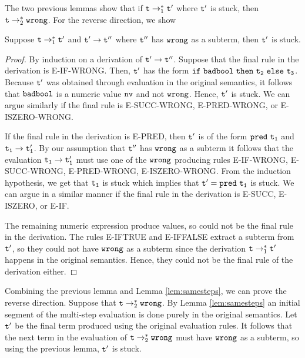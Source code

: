 The two previous lemmas show that if $\term{t} \marr_1 \term{t'}$ where $\term{t'}$ is stuck,
then $\term{t} \marr_2 \wrong$.  For the reverse direction, we show

\begin{lem} Suppose $\term{t} \marr_1 \term{t'}$ and $\term{t'} \sarr_2 \term{t''}$ where $\term{t''}$
    has $\wrong$ as a subterm, then $\term{t'}$ is stuck.
\end{lem}
\begin{proof} By induction on a derivation of $\term{t'} \sarr_2 \term{t''}$.
    Suppose that the final rule in the derivation is E-IF-WRONG. Then, $\term{t'}$ has the form
    $\ifthenelse{\badbool}{\term{t_2}}{\term{t_3}}$.  Because $\term{t'}$ was obtained through evaluation
    in the original semantics, it follows that $\badbool$ is a numeric value $\term{nv}$ and not $\wrong$.
    Hence, $\term{t'}$ is stuck.
    We can argue similarly if the final rule is E-SUCC-WRONG, E-PRED-WRONG, or E-ISZERO-WRONG.  

    If the final rule in the derivation is E-PRED, then $\term{t'}$ is of the form
    $\pred{\term{t_1}}$ and $\term{t_1} \sarr_2 \term{t_1'}$.  By our assumption that $\term{t''}$
    has $\wrong$ as a subterm it follows that the evaluation $\term{t_1} \sarr_2 \term{t_1'}$ must use
    one of the $\wrong$ producing rules E-IF-WRONG, E-SUCC-WRONG, E-PRED-WRONG, E-ISZERO-WRONG.  From the 
    induction hypothesis, we get that $\term{t_1}$ is stuck which implies that 
    $\term{t'} = \pred{\term{t_1}}$ is stuck.  We can argue in a similar manner if the final rule in
    the derivation is E-SUCC, E-ISZERO, or E-IF.

    The remaining numeric expression produce values, so could not be the final rule in the derivation.
    The rules E-IFTRUE and E-IFFALSE extract a subterm from $\term{t'}$, so they could not have $\wrong$
    as a subterm since the derivation $\term{t} \marr_1 \term{t'}$ happens in the original semantics.
    Hence, they could not be the final rule of the derivation either.
\end{proof}

Combining the previous lemma and Lemma \ref{lem:samesteps}, we can prove the reverse direction.
Suppose that $\term{t} \marr_2 \wrong$.  By Lemma \ref{lem:samesteps} an initial segment of the 
multi-step evaluation is done purely in the original semantics.  Let $\term{t'}$ be the final term produced
using the original evaluation rules.  It follows that the next term in the evaluation of 
$\term{t} \marr_2 \wrong$ must have $\wrong$ as a subterm, so using the previous lemma, 
$\term{t'}$ is stuck.


